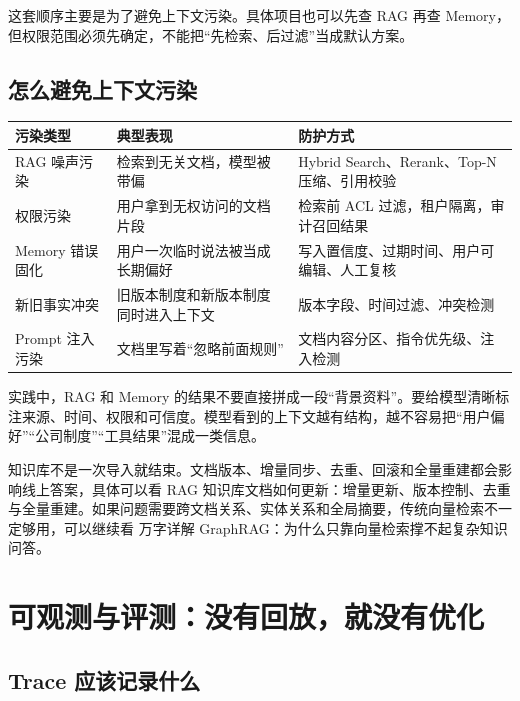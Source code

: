 \documentclass[9pt,a4paper,twocolumn]{ctexart}
\begin{document}
这套顺序主要是为了避免上下文污染。具体项目也可以先查 RAG 再查 Memory，但权限范围必须先确定，不能把“先检索、后过滤”当成默认方案。



\subsection*{怎么避免上下文污染}

{\footnotesize
\begin{tabular}{|p{}|p{}|p{}|}
\hline
\textbf{污染类型} & \textbf{典型表现} & \textbf{防护方式} \\
\hline
RAG 噪声污染 & 检索到无关文档，模型被带偏 & Hybrid Search、Rerank、Top-N 压缩、引用校验 \\
\hline
权限污染 & 用户拿到无权访问的文档片段 & 检索前 ACL 过滤，租户隔离，审计召回结果 \\
\hline
Memory 错误固化 & 用户一次临时说法被当成长期偏好 & 写入置信度、过期时间、用户可编辑、人工复核 \\
\hline
新旧事实冲突 & 旧版本制度和新版本制度同时进入上下文 & 版本字段、时间过滤、冲突检测 \\
\hline
Prompt 注入污染 & 文档里写着“忽略前面规则” & 文档内容分区、指令优先级、注入检测 \\
\hline
\end{tabular}
}



实践中，RAG 和 Memory 的结果不要直接拼成一段“背景资料”。要给模型清晰标注来源、时间、权限和可信度。模型看到的上下文越有结构，越不容易把“用户偏好”“公司制度”“工具结果”混成一类信息。



知识库不是一次导入就结束。文档版本、增量同步、去重、回滚和全量重建都会影响线上答案，具体可以看 RAG 知识库文档如何更新：增量更新、版本控制、去重与全量重建。如果问题需要跨文档关系、实体关系和全局摘要，传统向量检索不一定够用，可以继续看 万字详解 GraphRAG：为什么只靠向量检索撑不起复杂知识问答。



\section*{可观测与评测：没有回放，就没有优化}


\subsection*{Trace 应该记录什么}
\end{document}
